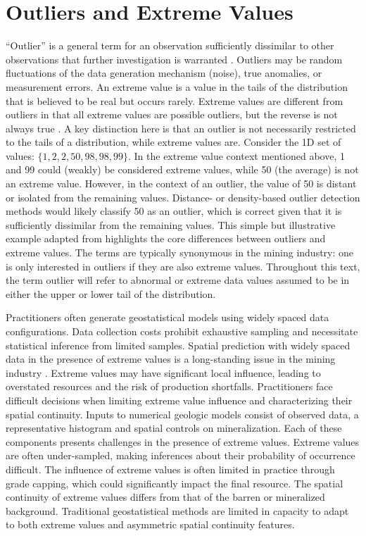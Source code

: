 \FloatBarrier
\section{Outliers and Extreme Values}
\label{sec:02extreme}

``Outlier'' is a general term for an observation sufficiently dissimilar to other observations that further investigation is warranted \citep{barnett1984outliers}. Outliers may be random fluctuations of the data generation mechanism (noise), true anomalies, or measurement errors. An extreme value is a value in the tails of the distribution that is believed to be real but occurs rarely. Extreme values are different from outliers in that all extreme values are possible outliers, but the reverse is not always true \citep{aggarwal2016outlier}. A key distinction here is that an outlier is not necessarily restricted to the tails of a distribution, while extreme values are. Consider the \gls{1D} set of values: $\{1,2,2,50,98,98,99\}$. In the extreme value context mentioned above, 1 and 99 could (weakly) be considered extreme values, while 50 (the average) is not an extreme value. However, in the context of an outlier, the value of 50 is distant or isolated from the remaining values. Distance- or density-based outlier detection methods would likely classify 50 as an outlier, which is correct given that it is sufficiently dissimilar from the remaining values. This simple but illustrative example adapted from \cite{aggarwal2016outlier} highlights the core differences between outliers and extreme values. The terms are typically synonymous in the mining industry: one is only interested in outliers if they are also extreme values. Throughout this text, the term outlier will refer to abnormal or extreme data values assumed to be in either the upper or lower tail of the distribution.

Practitioners often generate geostatistical models using widely spaced data configurations. Data collection costs prohibit exhaustive sampling and necessitate statistical inference from limited samples. Spatial prediction with widely spaced data in the presence of extreme values is a long-standing issue in the mining industry \citep{leuangthong2015dealing}. Extreme values may have significant local influence, leading to overstated resources and the risk of production shortfalls. Practitioners face difficult decisions when limiting extreme value influence and characterizing their spatial continuity. Inputs to numerical geologic models consist of observed data, a representative histogram and spatial controls on mineralization. Each of these components presents challenges in the presence of extreme values. Extreme values are often under-sampled, making inferences about their probability of occurrence difficult. The influence of extreme values is often limited in practice through grade capping, which could significantly impact the final resource. The spatial continuity of extreme values differs from that of the barren or mineralized background. Traditional geostatistical methods are limited in capacity to adapt to both extreme values and asymmetric spatial continuity features.

